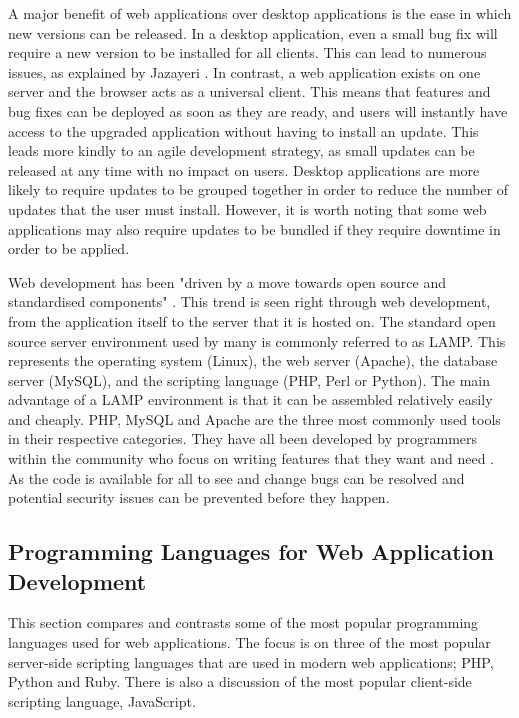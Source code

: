 \documentclass[authoryearcitations]{UoYCSproject}
\begin{document}
A major benefit of web applications over desktop applications is the ease in which new versions can be released. In a desktop application, even a small bug fix will require a new version to be installed for all clients. This can lead to numerous issues, as explained by Jazayeri \citep{Jazayeri2007}. In contrast, a web application exists on one server and the browser acts as a universal client. This means that features and bug fixes can be deployed as soon as they are ready, and users will instantly have access to the upgraded application without having to install an update. This leads more kindly to an agile development strategy, as small updates can be released at any time with no impact on users. Desktop applications are more likely to require updates to be grouped together in order to reduce the number of updates that the user must install. However, it is worth noting that some web applications may also require updates to be bundled if they require downtime in order to be applied.  

Web development has been "driven by a move towards open source and standardised components" \citep{Jazayeri2007}. This trend is seen right through web development, from the application itself to the server that it is hosted on. The standard open source server environment used by many is commonly referred to as LAMP. This represents the operating system (Linux), the web server (Apache), the database server (MySQL), and the scripting language (PHP, Perl or Python). The main advantage of a  LAMP environment is that it can be assembled relatively easily and cheaply. PHP, MySQL and Apache are the three most commonly used tools in their respective categories. They have all been developed by programmers within the community who focus on writing features that they want and need \citep{Nixon2009}. As the code is available for all to see and change bugs can be resolved and potential security issues can be prevented before they happen.


\subsection{Programming Languages for Web Application Development}

This section compares and contrasts some of the most popular programming languages used for web applications. The focus is on three of the most popular server-side scripting languages that are used in modern web applications; PHP, Python and Ruby. There is also a discussion of the most popular client-side scripting language, JavaScript.
\end{document}
